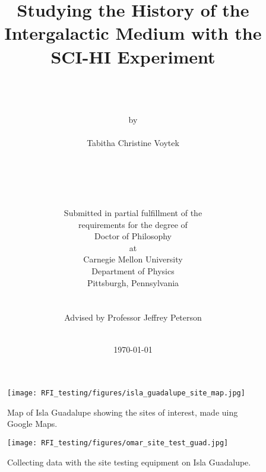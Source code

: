 \documentclass[12pt,twoside]{report}
\author{\\
	\\
	\\
	by \\
	\\
      	Tabitha Christine Voytek \\
	\\
	\\
	\\
	\\
	\\
        Submitted in partial fulfillment of the \\
        requirements for the degree of \\
        Doctor of Philosophy \\
        at \\
        Carnegie Mellon University \\
        Department of Physics \\
        Pittsburgh, Pennsylvania \\
	\\
        \\
	Advised by Professor Jeffrey Peterson
	\\
	\\
}
\title{\bf{ 
Studying the History of the Intergalactic Medium with the SCI-HI Experiment
}}
\date{\today}
\begin{document}



%



%






%

%

%

%

%

%

%

%

%


\begin{figure}[htb]
\centering
\begin{minipage}[b]{0.47\textwidth}
\centering
\texttt{[image: RFI\_testing/figures/isla\_guadalupe\_site\_map.jpg]}
\caption{Map of Isla Guadalupe showing the sites of interest, made uing Google Maps. }
\label{Fig:guadmap}
\end{minipage}%
\begin{minipage}[b]{0.02\textwidth}
\hspace{1cm}
\end{minipage}%
\begin{minipage}[b]{0.47\textwidth}
\centering
\texttt{[image: RFI\_testing/figures/omar\_site\_test\_guad.jpg]}
\caption{Collecting data with the site testing equipment on Isla Guadalupe.}
\label{Fig:guadsite}
\end{minipage}
\end{figure}
\end{document}
